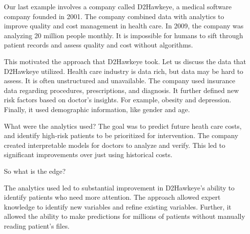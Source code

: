 
Our last example involves a company called D2Hawkeye,
a medical software company founded in 2001.
The company combined data with analytics
to improve quality and cost management in health care.
In 2009, the company was analyzing 20 million people
monthly.
It is impossible for humans to sift through patient records
and assess quality and cost without algorithms.

This motivated the approach that D2Hawkeye took.
Let us discuss the data that D2Hawkeye utilized.
Health care industry is data rich,
but data may be hard to assess.
It is often unstructured and unavailable.
The company used insurance data regarding procedures,
prescriptions, and diagnosis.
It further defined new risk factors
based on doctor's insights.
For example, obesity and depression.
Finally, it used demographic information,
like gender and age.

What were the analytics used?
The goal was to predict future heath care costs,
and identify high-risk patients to be
prioritized for intervention.
The company created interpretable models
for doctors to analyze and verify.
This led to significant improvements
over just using historical costs.

So what is the edge?

The analytics used led to substantial improvement
in D2Hawkeye's ability to identify
patients who need more attention.
The approach allowed expert knowledge
to identify new variables and refine existing variables.
Further, it allowed the ability to make predictions
for millions of patients without manually
reading patient's files.